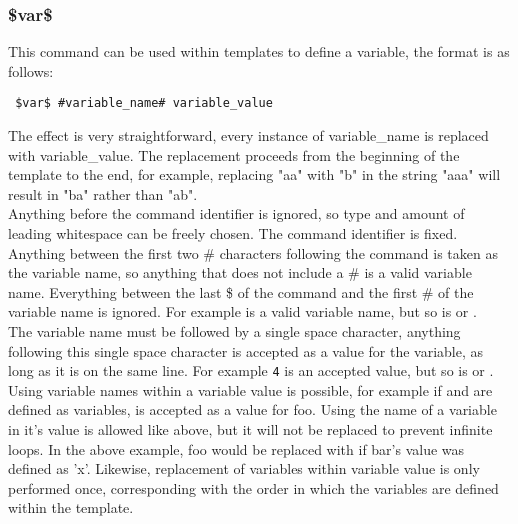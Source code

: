 \documentclass{settings/TU_Delft_Report}
\begin{document}
\subsubsection{\$var\$}
This command can be used within templates to define a variable, the format is as follows:
\begin{lstlisting}
 $var$ #variable_name# variable_value
\end{lstlisting}

The effect is very straightforward, every instance of variable\_name is replaced with variable\_value. The replacement proceeds from the beginning of the template to the end, for example, replacing "aa" with "b" in the string "aaa" will result in "ba" rather than "ab".\\

Anything before the command identifier is ignored, so type and amount of leading whitespace can be freely chosen. The  command identifier is fixed.\\

Anything between the first two \# characters following the  command is taken as the variable name, so anything that does not include a \# is a valid variable name. Everything between the last \$ of the command and the first \# of the variable name is ignored. For example  is a valid variable name, but so is  or .\\

The variable name must be followed by a single space character, anything following this single space character is accepted as a value for the variable, as long as it is on the same line. For example \lstinline{4} is an accepted value, but so is  or  .\\

Using variable names within a variable value is possible, for example if  and  are defined as variables,  is accepted as a value for foo. Using the name of a variable in it's value is allowed like above, but it will not be replaced to prevent infinite loops. In the above example, foo would be replaced with  if bar's value was defined as 'x'. Likewise, replacement of variables within variable value is only performed once, corresponding with the order in which the variables are defined within the template.
\end{document}
